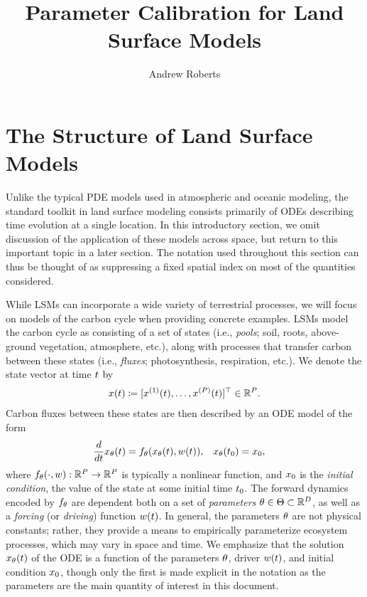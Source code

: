 \documentclass[12pt]{article}
\title{Parameter Calibration for Land Surface Models}
\author{Andrew Roberts}
\begin{document}
\maketitle

\section{The Structure of Land Surface Models}
Unlike the typical PDE models used in atmospheric and oceanic modeling, the standard toolkit in land surface modeling 
consists primarily of ODEs describing time evolution at a single location. In this introductory section, we omit discussion 
of the application of these models across space, but return to this important topic in a later section. The notation 
used throughout this section can thus be thought of as suppressing a fixed spatial index on most of the quantities considered. 

While LSMs can incorporate a wide 
variety of terrestrial processes, we will focus on models of the carbon cycle when providing concrete examples. 
LSMs model the carbon cycle as consisting of a set of states (i.e., \textit{pools}; soil, roots, above-ground vegetation, atmosphere, etc.),
along with processes that transfer carbon between these states (i.e., \textit{fluxes}; photosynthesis, respiration, etc.). 
We denote the state vector at time $\Time$ by 
\begin{align}
\state(\Time) \Def [\indexState[1]{\state}(\Time), \dots, \indexState[\dimState]{\state}(\Time)]^\top \in \R^{\dimState}.
\end{align}
Carbon fluxes between these states are then described by an ODE model of the form
\begin{align}
&\frac{d}{d\Time} \state_{\Par}(\Time) = \funcODE_{\Par}(\state_{\Par}(\Time), \forcing(\Time)), &&\state_{\Par}(\timeInit) = \stateInit, 
\end{align}
where $\funcODE_{\Par}(\cdot, \forcing): \R^{\dimState} \to \R^{\dimState}$ is typically a nonlinear function, and $\stateInit$ is the \textit{initial condition}, 
the value of the state at some initial time $\timeInit$. The forward dynamics encoded by $\funcODE_{\Par}$ are dependent both on a set of 
\textit{parameters} $\Par \in \parSpace \subset \R^{\dimPar}$, as well as a \textit{forcing} (or \textit{driving}) function $\forcing(\Time)$.
In general, the parameters $\Par$ are not physical constants; rather, they provide a means to empirically parameterize ecosystem 
processes, which may vary in space and time.   
We emphasize that the solution $\state_{\Par}(\Time)$ of the ODE is a function of the parameters $\Par$, driver $\forcing(\Time)$, and 
initial condition $\stateInit$, though only the first is made explicit in the notation as the parameters are the main quantity of interest in this document.
\end{document}

